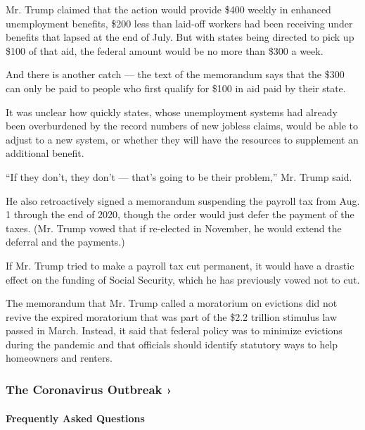 Mr. Trump claimed that the action would provide \$400 weekly in enhanced
unemployment benefits, \$200 less than laid-off workers had been
receiving under benefits that lapsed at the end of July. But with states
being directed to pick up \$100 of that aid, the federal amount would be
no more than \$300 a week.

And there is another catch --- the text of the memorandum says that the
\$300 can only be paid to people who first qualify for \$100 in aid paid
by their state.

It was unclear how quickly states, whose unemployment systems had
already been overburdened by the record numbers of new jobless claims,
would be able to adjust to a new system, or whether they will have the
resources to supplement an additional benefit.

``If they don't, they don't --- that's going to be their problem,'' Mr.
Trump said.

He also retroactively signed a memorandum suspending the payroll tax
from Aug. 1 through the end of 2020, though the order would just defer
the payment of the taxes. (Mr. Trump vowed that if re-elected in
November, he would extend the deferral and the payments.)

If Mr. Trump tried to make a payroll tax cut permanent, it would have a
drastic effect on the funding of Social Security, which he has
previously vowed not to cut.

The memorandum that Mr. Trump called a moratorium on evictions did not
revive the expired moratorium that was part of the \$2.2 trillion
stimulus law passed in March. Instead, it said that federal policy was
to minimize evictions during the pandemic and that officials should
identify statutory ways to help homeowners and renters.

\href{https://www.nytimes.com/news-event/coronavirus?action=click\&pgtype=Article\&state=default\&region=MAIN_CONTENT_3\&context=storylines_faq}{}

\hypertarget{the-coronavirus-outbreak-}{%
\subsubsection{The Coronavirus Outbreak
›}\label{the-coronavirus-outbreak-}}

\hypertarget{frequently-asked-questions}{%
\paragraph{Frequently Asked
Questions}\label{frequently-asked-questions}}

